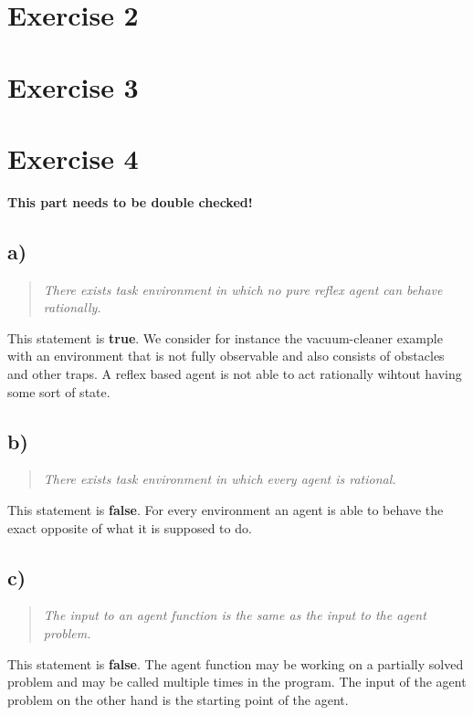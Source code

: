 \documentclass[11pt]{article}
\begin{document}
\section*{Exercise 2}

\newpage

\section*{Exercise 3}

\newpage
\section*{Exercise 4}
\textbf{This part needs to be double checked!}
\subsection*{a)}
\begin{quotation}\noindent
\textit{There exists task environment in which no pure reflex agent can behave rationally.}
\end{quotation}
\noindent
This statement is \textbf{true}. We consider for instance the vacuum-cleaner example with an environment that is not fully observable and also consists of obstacles and other traps. A reflex based agent is not able to act rationally wihtout having some sort of state.

\subsection*{b)}
\begin{quotation}\noindent
\textit{There exists task environment in which every agent is rational.}
\end{quotation}
\noindent
This statement is \textbf{false}. For every environment an agent is able to behave the exact opposite of what it is supposed to do.

\subsection*{c)}
\begin{quotation}\noindent
\textit{The input to an agent function is the same as the input to the agent problem.}
\end{quotation}
\noindent
This statement is \textbf{false}. The agent function may be working on a partially solved problem and may be called multiple times in the program. The input of the agent problem on the other hand is the starting point of the agent.
\end{document}
